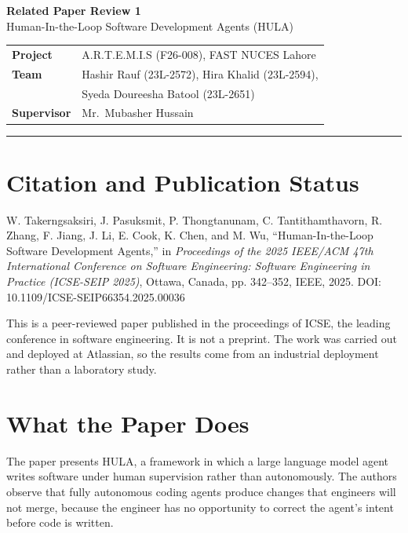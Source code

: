 \documentclass[11pt,a4paper]{article}
\begin{document}
\begin{center}
{\large\bfseries Related Paper Review 1}\\[0.4em]
{\large Human-In-the-Loop Software Development Agents (HULA)}
\end{center}

\vspace{0.6em}

\begin{center}
\begin{tabular}{@{}ll@{}}
\textbf{Project} & A.R.T.E.M.I.S (F26-008), FAST NUCES Lahore \\
\textbf{Team} & Hashir Rauf (23L-2572), Hira Khalid (23L-2594), \\
 & Syeda Doureesha Batool (23L-2651) \\
\textbf{Supervisor} & Mr.\ Mubasher Hussain \\
\end{tabular}
\end{center}

\vspace{0.4em}
\hrule
\vspace{0.8em}

\section{Citation and Publication Status}

W. Takerngsaksiri, J. Pasuksmit, P. Thongtanunam, C. Tantithamthavorn, R. Zhang,
F. Jiang, J. Li, E. Cook, K. Chen, and M. Wu, ``Human-In-the-Loop Software
Development Agents,'' in \textit{Proceedings of the 2025 IEEE/ACM 47th
International Conference on Software Engineering: Software Engineering in
Practice (ICSE-SEIP 2025)}, Ottawa, Canada, pp. 342--352, IEEE, 2025.
DOI: 10.1109/ICSE-SEIP66354.2025.00036

This is a peer-reviewed paper published in the proceedings of ICSE, the leading
conference in software engineering. It is not a preprint. The work was carried
out and deployed at Atlassian, so the results come from an industrial
deployment rather than a laboratory study.

\section{What the Paper Does}

The paper presents HULA, a framework in which a large language model agent
writes software under human supervision rather than autonomously. The authors
observe that fully autonomous coding agents produce changes that engineers will
not merge, because the engineer has no opportunity to correct the agent's
intent before code is written.
\end{document}
